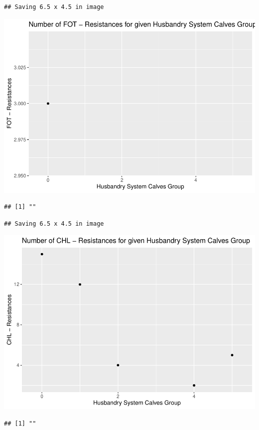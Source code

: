 \documentclass[
]{article}
\begin{document}
\begin{verbatim}
## Saving 6.5 x 4.5 in image
\end{verbatim}

\includegraphics{NResistenzen_files/figure-latex/binary_or_nominal_variables-35.pdf}

\begin{verbatim}
## [1] ""
\end{verbatim}

\begin{verbatim}
## Saving 6.5 x 4.5 in image
\end{verbatim}

\includegraphics{NResistenzen_files/figure-latex/binary_or_nominal_variables-36.pdf}

\begin{verbatim}
## [1] ""
\end{verbatim}
\end{document}
